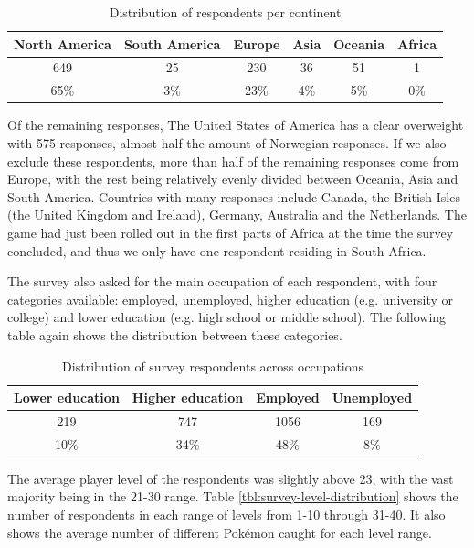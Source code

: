 \begin{table}[h]
	\centering
	\caption{Distribution of respondents per continent}
	\label{tbl:demographics-continents}
	\begin{tabular}{|c|c|c|c|c|c|}
		\hline
		\textbf{North America} & \textbf{South America} & \textbf{Europe} & \textbf{Asia} & \textbf{Oceania} & \textbf{Africa}\\
		\hline\hline
		649		& 25	& 230	& 36	& 51	& 1\\
		65\%	& 3\%	& 23\%	& 4\%	& 5\%	& 0\%\\\hline
	\end{tabular}
\end{table}

Of the remaining responses, The United States of America has a clear overweight with 575 responses, almost half the amount of Norwegian responses. If we also exclude these respondents, more than half of the remaining responses come from Europe, with the rest being relatively evenly divided between Oceania, Asia and South America. Countries with many responses include Canada, the British Isles (the United Kingdom and Ireland), Germany, Australia and the Netherlands. The game had just been rolled out in the first parts of Africa at the time the survey concluded, and thus we only have one respondent residing in South Africa.

The survey also asked for the main occupation of each respondent, with four categories available: employed, unemployed, higher education (e.g. university or college) and lower education (e.g. high school or middle school). The following table again shows the distribution between these categories.

\begin{table}[h]
	\centering
	\caption{Distribution of survey respondents across occupations}
	\label{tbl:survey-occupation-distribution}
	\begin{tabular}{|c|c|c|c|}
		\hline
		\textbf{Lower education} & \textbf{Higher education} & \textbf{Employed} & \textbf{Unemployed}\\
		\hline\hline
		219 & 747 & 1056 & 169\\
		10\% & 34\% & 48\% & 8\%\\
		\hline
	\end{tabular}
\end{table}

The average player level of the respondents was slightly above 23, with the vast majority being in the 21-30 range. Table \ref{tbl:survey-level-distribution} shows the number of respondents in each range of levels from 1-10 through 31-40. It also shows the average number of different Pokémon caught for each level range.

